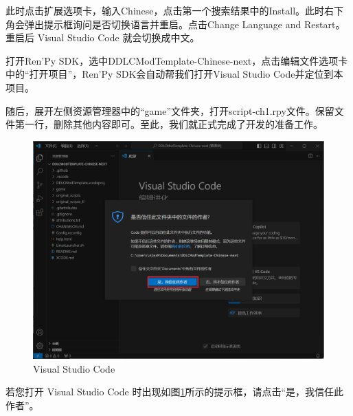 \documentclass[../../Main.tex]{subfiles}
\begin{document}
此时点击扩展选项卡，输入Chinese，点击第一个搜索结果中的Install。此时右下角会弹出提示框询问是否切换语言并重启。点击Change Language and Restart。重启后 Visual Studio Code 就会切换成中文。

打开Ren'Py SDK，选中DDLCModTemplate-Chinese-next，点击编辑文件选项卡中的“打开项目”，Ren'Py SDK会自动帮我们打开Visual Studio Code并定位到本项目。

随后，展开左侧资源管理器中的“game”文件夹，打开script-ch1.rpy文件。保留文件第一行，删除其他内容即可。至此，我们就正式完成了开发的准备工作。

\begin{figure}[htbp]
    \centering
    \includegraphics[scale=.4]{2.2/2.2.1}
    \caption{Visual Studio Code}
    \label{fig:2.1.2.2}
\end{figure}
若您打开 Visual Studio Code 时出现如图\ref{fig:2.1.2.2}所示的提示框，请点击“是，我信任此作者”。
\end{document}
